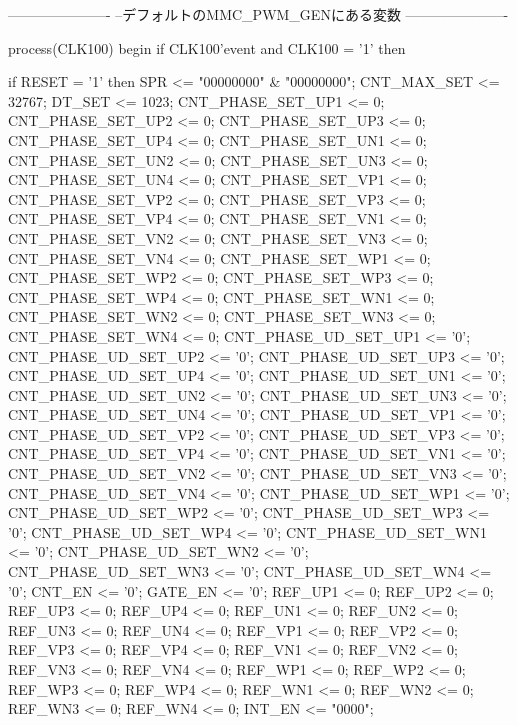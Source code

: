 \begin{mylisting}[language=VHDL,caption=ゲート信号出力モジュール,label=MMC_PWM_GEN_module_VHDL]
	----------------------
	--デフォルトのMMC_PWM_GENにある変数
	----------------------
	
	process(CLK100)
	begin
		if CLK100'event and CLK100 = '1' then

			if RESET = '1' then
				SPR				<= "00000000" & "00000000";
				CNT_MAX_SET			<= 32767;
				DT_SET				<= 1023;
				CNT_PHASE_SET_UP1	<= 0;
				CNT_PHASE_SET_UP2	<= 0;
				CNT_PHASE_SET_UP3	<= 0;
				CNT_PHASE_SET_UP4	<= 0;
				CNT_PHASE_SET_UN1	<= 0;
				CNT_PHASE_SET_UN2	<= 0;
				CNT_PHASE_SET_UN3	<= 0;
				CNT_PHASE_SET_UN4	<= 0;
				CNT_PHASE_SET_VP1	<= 0;
				CNT_PHASE_SET_VP2	<= 0;
				CNT_PHASE_SET_VP3	<= 0;
				CNT_PHASE_SET_VP4	<= 0;
				CNT_PHASE_SET_VN1	<= 0;
				CNT_PHASE_SET_VN2	<= 0;
				CNT_PHASE_SET_VN3	<= 0;
				CNT_PHASE_SET_VN4	<= 0;
				CNT_PHASE_SET_WP1	<= 0;
				CNT_PHASE_SET_WP2	<= 0;
				CNT_PHASE_SET_WP3	<= 0;
				CNT_PHASE_SET_WP4	<= 0;
				CNT_PHASE_SET_WN1	<= 0;
				CNT_PHASE_SET_WN2	<= 0;
				CNT_PHASE_SET_WN3	<= 0;
				CNT_PHASE_SET_WN4	<= 0;
				CNT_PHASE_UD_SET_UP1	<= '0';
				CNT_PHASE_UD_SET_UP2	<= '0';
				CNT_PHASE_UD_SET_UP3	<= '0';
				CNT_PHASE_UD_SET_UP4	<= '0';
				CNT_PHASE_UD_SET_UN1	<= '0';
				CNT_PHASE_UD_SET_UN2	<= '0';
				CNT_PHASE_UD_SET_UN3	<= '0';
				CNT_PHASE_UD_SET_UN4	<= '0';
				CNT_PHASE_UD_SET_VP1	<= '0';
				CNT_PHASE_UD_SET_VP2	<= '0';
				CNT_PHASE_UD_SET_VP3	<= '0';
				CNT_PHASE_UD_SET_VP4	<= '0';
				CNT_PHASE_UD_SET_VN1	<= '0';
				CNT_PHASE_UD_SET_VN2	<= '0';
				CNT_PHASE_UD_SET_VN3	<= '0';
				CNT_PHASE_UD_SET_VN4	<= '0';
				CNT_PHASE_UD_SET_WP1	<= '0';
				CNT_PHASE_UD_SET_WP2	<= '0';
				CNT_PHASE_UD_SET_WP3	<= '0';
				CNT_PHASE_UD_SET_WP4	<= '0';
				CNT_PHASE_UD_SET_WN1	<= '0';
				CNT_PHASE_UD_SET_WN2	<= '0';
				CNT_PHASE_UD_SET_WN3	<= '0';
				CNT_PHASE_UD_SET_WN4	<= '0';
				CNT_EN					<= '0';
				GATE_EN					<= '0';
				REF_UP1				<= 0;
				REF_UP2				<= 0;
				REF_UP3				<= 0;
				REF_UP4				<= 0;
				REF_UN1				<= 0;
				REF_UN2				<= 0;
				REF_UN3				<= 0;
				REF_UN4				<= 0;
				REF_VP1				<= 0;
				REF_VP2				<= 0;
				REF_VP3				<= 0;
				REF_VP4				<= 0;
				REF_VN1				<= 0;
				REF_VN2				<= 0;
				REF_VN3				<= 0;
				REF_VN4				<= 0;
				REF_WP1				<= 0;
				REF_WP2				<= 0;
				REF_WP3				<= 0;
				REF_WP4				<= 0;
				REF_WN1				<= 0;
				REF_WN2				<= 0;
				REF_WN3				<= 0;
				REF_WN4				<= 0;
				INT_EN				<= "0000";
				

\end{mylisting}
